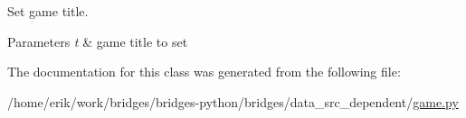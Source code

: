 Set game title. 


\begin{DoxyParams}{Parameters}
{\em t} & game title to set \\
\hline
\end{DoxyParams}


The documentation for this class was generated from the following file\+:\begin{DoxyCompactItemize}
\item 
/home/erik/work/bridges/bridges-\/python/bridges/data\+\_\+src\+\_\+dependent/\hyperlink{game_8py}{game.\+py}\end{DoxyCompactItemize}
